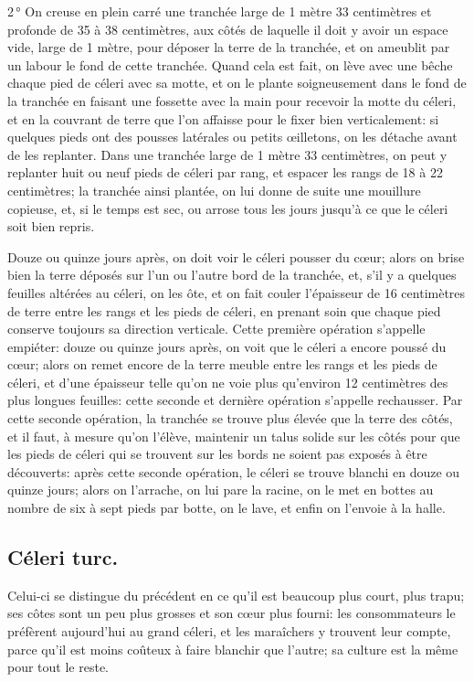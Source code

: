\documentclass[10pt,a4paper]{book}
\begin{document}
2\,° On creuse en plein carré une tranchée large de 1 mètre 33 centimètres et profonde de 35 à 38 centimètres, aux côtés de laquelle il doit y avoir un espace vide, large de 1 mètre, pour déposer la terre de la tranchée, et on ameublit par un labour le fond de cette tranchée. Quand cela est fait, on lève avec une bêche chaque pied de céleri avec sa motte, et on le plante soigneusement dans le fond de la tranchée en faisant une fossette avec la main pour recevoir la motte du céleri, et en la couvrant de terre que l'on affaisse pour le fixer bien verticalement: si quelques pieds ont des pousses latérales ou petits œilletons, on les détache avant de les replanter. Dans une tranchée large de 1 mètre 33 centimètres, on peut y replanter huit ou neuf pieds de céleri par rang, et espacer les rangs de 18 à 22 centimètres; la tranchée ainsi plantée, on lui donne de suite une mouillure copieuse, et, si le temps est sec, ou arrose tous les jours jusqu'à ce que le céleri soit bien repris.

Douze ou quinze jours après, on doit voir le céleri pousser du cœur; alors on brise bien la terre déposés sur l'un ou l'autre bord de la tranchée, et, s'il y a quelques feuilles altérées au céleri, on les ôte, et on fait couler l'épaisseur de 16 centimètres de terre entre les rangs et les pieds de céleri, en prenant soin que chaque pied conserve toujours sa direction verticale. Cette première opération s'appelle empiéter: douze ou quinze jours après, on voit que le céleri a encore poussé du cœur; alors on remet encore de la terre meuble entre les rangs et les pieds de céleri, et d'une épaisseur telle qu'on ne voie plus qu'environ 12 centimètres des plus longues feuilles: cette seconde et dernière opération s'appelle rechausser. Par cette seconde opération, la tranchée se trouve plus élevée que la terre des côtés, et il faut, à mesure qu'on l'élève, maintenir un talus solide sur les côtés pour que les pieds de céleri qui se trouvent sur les bords ne soient pas exposés à être découverts: après cette seconde opération, le céleri se trouve blanchi en douze ou quinze jours; alors on l'arrache, on lui pare la racine, on le met en bottes au nombre de six à sept pieds par botte, on le lave, et enfin on l'envoie à la halle.

\subsection{Céleri turc.}

Celui-ci se distingue du précédent en ce qu'il est beaucoup plus court, plus trapu; ses côtes sont un peu plus grosses et son cœur plus fourni: les consommateurs le préfèrent aujourd'hui au grand céleri, et les maraîchers y trouvent leur compte, parce qu'il est moins coûteux à faire blanchir que l'autre; sa culture est la même pour tout le reste.
\end{document}
